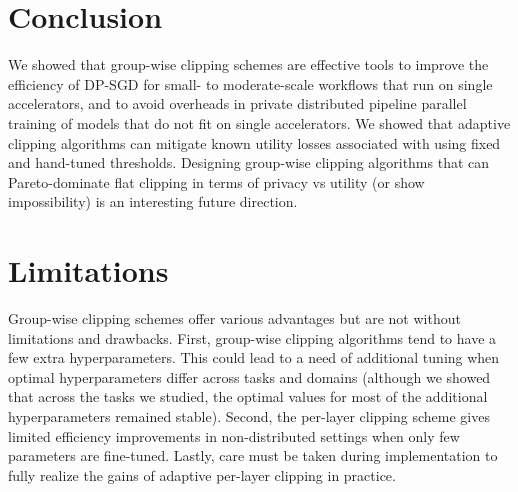 \vspace{-2mm}
\section{Conclusion}
\vspace{-2mm}
We showed that group-wise clipping schemes are effective tools to improve the efficiency of DP-SGD for small- to moderate-scale workflows that run on single accelerators, and to avoid overheads in private distributed pipeline parallel training of models that do not fit on single accelerators. 
We showed that adaptive clipping algorithms can mitigate known utility losses associated with using fixed and hand-tuned thresholds. 
Designing group-wise clipping algorithms that can Pareto-dominate flat clipping in terms of privacy vs utility (or show impossibility) is an interesting future direction.

\section*{Limitations}
Group-wise clipping schemes offer various advantages but are not without limitations and drawbacks.
First, group-wise clipping algorithms tend to have a few extra hyperparameters. This could lead to a need of additional tuning when optimal hyperparameters differ across tasks and domains (although we showed that across the tasks we studied, the optimal values for most of the additional hyperparameters remained stable). 
Second, the per-layer clipping scheme gives limited efficiency improvements in non-distributed settings when only few parameters are fine-tuned.
Lastly, care must be taken during implementation to fully realize the gains of adaptive per-layer clipping in practice. 

